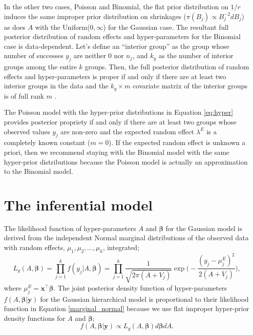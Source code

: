 \documentclass[article]{jss}
\begin{document}
In the other two cases, Poisson and Binomial, the flat prior distribution on $1/r$ induces the same improper prior distribution on shrinkages ($\pi(B_{j})\propto B_{j}^{-2} d B_j$) as does $A$ with the Uniform($0, \infty$) for the Gaussian case. The resultant full posterior distribution of random effects and hyper-parameters for the Binomial case is data-dependent. Let's define an ``interior group'' as the group whose number of successes $y_j$ are neither 0 nor $n_j$, and $k_y$ as the number of interior groups among the entire $k$ groups. Then, the full posterior distribution of random effects and hyper-parameters is proper if and only if there are at least two interior groups in the data and the $k_y\times m$ covariate matrix of the interior groups is of full rank $m$ \citep{tak2016propriety}. 


The Poisson model with the hyper-prior distributions in Equation \ref{eq:hyper} provides posterior propriety if and only if there are at least two groups whose observed values $y_j$ are non-zero  and the expected random effect $\lambda^E$ is a completely known constant ($m=0$). If the expected random effect is unknown a priori,  then we recommend staying with the Binomial model with the same hyper-prior distributions because the Poisson model is actually an approximation to the Binomial model. 



\section[Inference]{The inferential model}\label{inference}

The likelihood function of hyper-parameters $A$ and $\boldsymbol{\beta}$ for the Gaussian  model is derived from the independent Normal marginal distributions of the observed data with random effects, $\mu_1, \mu_2, \ldots, \mu_k$, integrated; %
\begin{equation}\label{marginal_normal}
L_g(A, \boldsymbol{\boldsymbol{\beta}})=\prod_{j=1}^k f(y_j\vert A, \boldsymbol{\boldsymbol{\beta}})=\prod_{j=1}^k \frac{1}{\sqrt{2\pi (A+V_j)}}\exp\big(-\frac{(y_j-\mu^E_j)^2}{2(A+V_j)}\big),
\end{equation}
where $\mu^E_j=\boldsymbol{x}^\top\boldsymbol{\beta}$. The joint posterior density  function of hyper-parameters $f(A, \boldsymbol{\boldsymbol{\beta}}\vert \boldsymbol{y})$ for the Gaussian hierarchical model is proportional to their likelihood function in Equation \ref{marginal_normal} because we use flat improper hyper-prior density functions for $A$ and $\boldsymbol{\beta}$;
\begin{equation}\label{marginal_post_normal}
f(A, \boldsymbol{\boldsymbol{\beta}}\vert \boldsymbol{y})\propto L_g(A, \boldsymbol{\boldsymbol{\beta}})d\boldsymbol{\beta}dA.
\end{equation}
\end{document}
